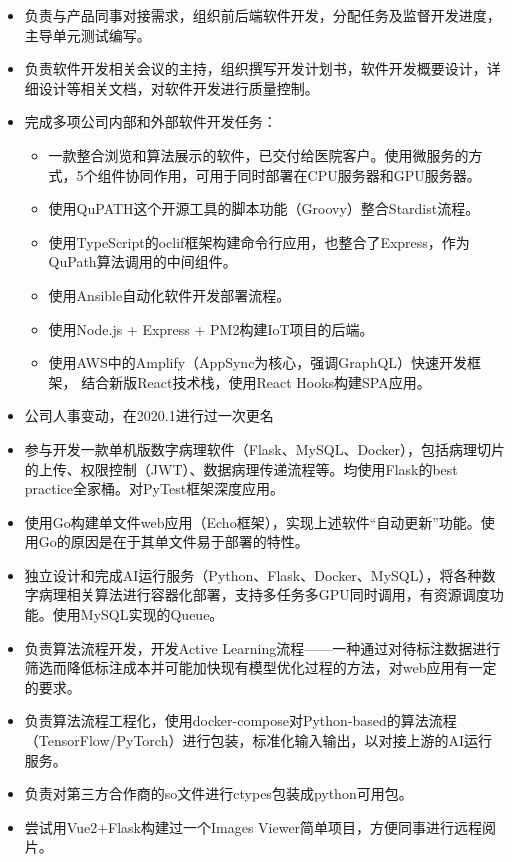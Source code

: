 \documentclass{resume}
\begin{document}
\begin{itemize}
  \item 负责与产品同事对接需求，组织前后端软件开发，分配任务及监督开发进度，主导单元测试编写。
  \item 负责软件开发相关会议的主持，组织撰写开发计划书，软件开发概要设计，详细设计等相关文档，对软件开发进行质量控制。
  \item 完成多项公司内部和外部软件开发任务：
    \begin{itemize}
    \item 一款整合浏览和算法展示的软件，已交付给医院客户。使用微服务的方式，5个组件协同作用，可用于同时部署在CPU服务器和GPU服务器。
    \item 使用QuPATH这个开源工具的脚本功能（Groovy）整合Stardist流程。
    \item 使用TypeScript的oclif框架构建命令行应用，也整合了Express，作为QuPath算法调用的中间组件。
    \item 使用Ansible自动化软件开发部署流程。
    \item 使用Node.js + Express + PM2构建IoT项目的后端。
    \item 使用AWS中的Amplify（AppSync为核心，强调GraphQL）快速开发框架，
    结合新版React技术栈，使用React Hooks构建SPA应用。
    \end{itemize}
\end{itemize}

\begin{itemize}
  \item 公司人事变动，在2020.1进行过一次更名
  \item 参与开发一款单机版数字病理软件（Flask、MySQL、Docker），包括病理切片的上传、权限控制（JWT）、数据病理传递流程等。均使用Flask的best practice全家桶。对PyTest框架深度应用。
  \item 使用Go构建单文件web应用（Echo框架），实现上述软件“自动更新”功能。使用Go的原因是在于其单文件易于部署的特性。
  \item 独立设计和完成AI运行服务（Python、Flask、Docker、MySQL），将各种数字病理相关算法进行容器化部署，支持多任务多GPU同时调用，有资源调度功能。使用MySQL实现的Queue。
  \item 负责算法流程开发，开发Active Learning流程——一种通过对待标注数据进行筛选而降低标注成本并可能加快现有模型优化过程的方法，对web应用有一定的要求。
  \item 负责算法流程工程化，使用docker-compose对Python-based的算法流程（TensorFlow/PyTorch）进行包装，标准化输入输出，以对接上游的AI运行服务。
  \item 负责对第三方合作商的so文件进行ctypes包装成python可用包。
  \item 尝试用Vue2+Flask构建过一个Images Viewer简单项目，方便同事进行远程阅片。
\end{itemize}
\end{document}
